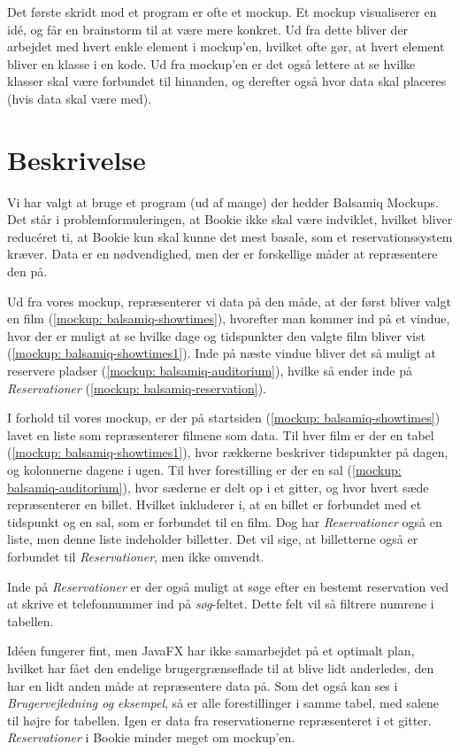 Det første skridt mod et program er ofte et mockup. Et mockup visualiserer en idé, og får en brainstorm til at være mere konkret. Ud fra dette bliver der arbejdet med hvert enkle element i mockup'en, hvilket ofte gør, at hvert element bliver en klasse i en kode. Ud fra mockup'en er det også lettere at se hvilke klasser skal være forbundet til hinanden, og derefter også hvor data skal placeres (hvis data skal være med).

\section{Beskrivelse}

Vi har valgt at bruge et program (ud af mange) der hedder Balsamiq Mockups.
Det står i problemformuleringen, at Bookie ikke skal være indviklet, hvilket bliver reducéret ti, at Bookie kun skal kunne det mest basale, som et reservationssystem kræver. Data er en nødvendighed, men der er forskellige måder at repræsentere den på.

Ud fra vores mockup, repræsenterer vi data på den måde, at der først bliver valgt en film (\ref{mockup: balsamiq-showtimes}), hvorefter man kommer ind på et vindue, hvor der er muligt at se hvilke dage og tidspunkter den valgte film bliver vist (\ref{mockup: balsamiq-showtimes1}). Inde på næste vindue bliver det så muligt at reservere pladser (\ref{mockup: balsamiq-auditorium}), hvilke så ender inde på \textit{Reservationer} (\ref{mockup: balsamiq-reservation}).

I forhold til vores mockup, er der på startsiden (\ref{mockup: balsamiq-showtimes}) lavet en liste som repræsenterer filmene som data. Til hver film er der en tabel (\ref{mockup: balsamiq-showtimes1}), hvor rækkerne beskriver tidspunkter på dagen, og kolonnerne dagene i ugen. Til hver forestilling er der en sal (\ref{mockup: balsamiq-auditorium}), hvor sæderne er delt op i et gitter, og hvor hvert sæde repræsenterer en billet. Hvilket inkluderer i, at en billet er forbundet med et tidspunkt og en sal, som er forbundet til en film. Dog har \textit{Reservationer} også en liste, men denne liste indeholder billetter. Det vil sige, at billetterne også er forbundet til \textit{Reservationer}, men ikke omvendt.

Inde på \textit{Reservationer} er der også muligt at søge efter en bestemt reservation ved at skrive et telefonnummer ind på \textit{søg}-feltet. Dette felt vil så filtrere numrene i tabellen.

Idéen fungerer fint, men JavaFX har ikke samarbejdet på et optimalt plan, hvilket har fået den endelige brugergrænseflade til at blive lidt anderledes, den har en lidt anden måde at repræsentere data på. Som det også kan ses i \textit{Brugervejledning og eksempel}, så er alle forestillinger i samme tabel, med salene til højre for tabellen. Igen er data fra reservationerne repræsenteret i et gitter. \textit{Reservationer} i Bookie minder meget om mockup'en. 

